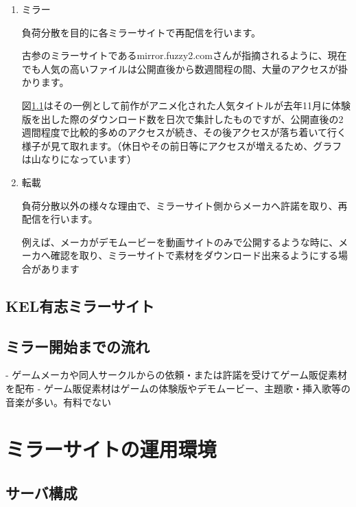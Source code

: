 \begin{enumerate}

 \item ミラー

  負荷分散を目的に各ミラーサイトで再配信を行います。

  古参のミラーサイトであるmirror.fuzzy2.comさんが指摘されるように、現在でも人気の高いファイルは公開直後から数週間程の間、大量のアクセスが掛かります。\cite{fuzzy2_1}

  図\ref{}はその一例として前作がアニメ化された人気タイトルが去年11月に体験版を出した際のダウンロード数を日次で集計したものですが、公開直後の2週間程度で比較的多めのアクセスが続き、その後アクセスが落ち着いて行く様子が見て取れます。（休日やその前日等にアクセスが増えるため、グラフは山なりになっています）

 

 \item 転載

  負荷分散以外の様々な理由で、ミラーサイト側からメーカへ許諾を取り、再配信を行います。

  例えば、メーカがデモムービーを動画サイトのみで公開するような時に、メーカへ確認を取り、ミラーサイトで素材をダウンロード出来るようにする場合があります

\end{enumerate}

 

 

\subsection{KEL有志ミラーサイト}

 

 

 

 

\subsection{ミラー開始までの流れ}
- ゲームメーカや同人サークルからの依頼・または許諾を受けてゲーム販促素材を配布
- ゲーム販促素材はゲームの体験版やデモムービー、主題歌・挿入歌等の音楽が多い。有料でない

\section{ミラーサイトの運用環境}

 

\subsection{サーバ構成}

